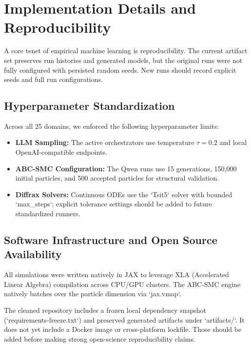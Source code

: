 \section{Implementation Details and Reproducibility}
\label{sec:reproducibility}

A core tenet of empirical machine learning is reproducibility. The current artifact set preserves run histories and generated models, but the original runs were not fully configured with persisted random seeds. New runs should record explicit seeds and full run configurations.

\subsection{Hyperparameter Standardization}
Across all 25 domains, we enforced the following hyperparameter limits:
\begin{itemize}
    \item \textbf{LLM Sampling:} The active orchestrators use temperature $\tau = 0.2$ and local OpenAI-compatible endpoints.
    \item \textbf{ABC-SMC Configuration:} The Qwen runs use 15 generations, 150,000 initial particles, and 500 accepted particles for structural validation.
    \item \textbf{Diffrax Solvers:} Continuous ODEs use the `Tsit5` solver with bounded `max_steps`; explicit tolerance settings should be added to future standardized runners.
\end{itemize}

\subsection{Software Infrastructure and Open Source Availability}
All simulations were written natively in JAX to leverage XLA (Accelerated Linear Algebra) compilation across CPU/GPU clusters. The ABC-SMC engine natively batches over the particle dimension via `jax.vmap`.

The cleaned repository includes a frozen local dependency snapshot (`requirements-freeze.txt`) and preserved generated artifacts under `artifacts/`. It does not yet include a Docker image or cross-platform lockfile. Those should be added before making strong open-science reproducibility claims.
